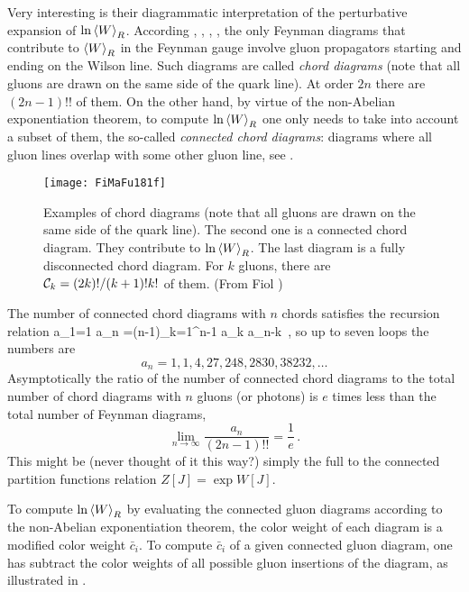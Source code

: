 \medskip

Very interesting is their diagrammatic interpretation of the perturbative
expansion of $\ln {\left< {W} \right>}_R$. According
, ,
, , the only Feynman diagrams that
contribute to ${\left< {W} \right>}_R$ in the Feynman gauge involve gluon propagators
starting and ending on the Wilson line. Such diagrams are called
\emph{chord diagrams} (note that all gluons are drawn on
the same side of the quark line). At order $2n$ there are $(2n-1)!!$ of
them. On the other hand, by virtue of the non-Abelian exponentiation
theorem, to compute $\ln {\left< {W} \right>}_R$ one only
needs to take into account a subset of them, the so-called
\emph{connected chord diagrams}: diagrams where all gluon lines overlap
with some other gluon line, see .

\begin{figure}
\centering
\texttt{[image: FiMaFu181f]}
\caption{
Examples of chord diagrams (note that all gluons are drawn on the same
side of the quark line). The second one is a connected chord diagram.
They contribute to $\ln {\left< {W} \right>}_R$.
The last diagram is a fully disconnected chord diagram. For $k$ gluons,
there are ${\cal C}_k= {(2k)!}/{(k+1)! k!}$ of them.
(From Fiol \etal{})
        }
\label{f:FiMaFu181f}
\end{figure}

The number of connected chord diagrams with $n$ chords satisfies the
recursion relation
\beq
a_1=1 \hspace{1cm} a_n =(n-1)\sum_{k=1}^{n-1} a_k a_{n-k}
\,,
so up to seven loops the numbers are
\[
a_n=1,1,4,27,248,2830,38232,\dots
\]
Asymptotically the ratio of the number of connected chord diagrams to the
total number of chord diagrams with $n$ gluons (or photons)
is $e$ times less than the total number of Feynman diagrams,
\[
\lim_{n\to \infty} \frac{a_n}{(2n-1)!!}=\frac{1}{e}
\,.
\]
This might be (never thought of it this way?) simply the full to the
connected partition functions relation
$Z[J]=\exp W[J]$.

To compute $\ln {\left< {W} \right>}_R$ by evaluating the connected gluon diagrams
according to the non-Abelian exponentiation
theorem, the color weight of each diagram is a
modified color weight $\bar c_i$. To compute $\bar c_i$ of a given
connected gluon diagram, one has subtract the color weights of all
possible gluon insertions of the diagram, as illustrated in
.

